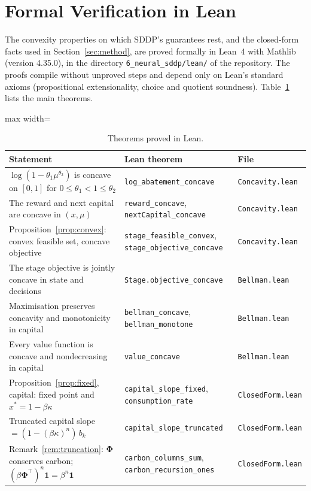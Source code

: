 \section{Formal Verification in Lean}
\label{app:lean}

The convexity properties on which SDDP's guarantees rest, and the closed-form facts used in Section~\ref{sec:method}, are proved formally in Lean~4 with Mathlib (version 4.35.0), in the directory \texttt{6\_neural\_sddp/lean/} of the repository. The proofs compile without unproved steps and depend only on Lean's standard axioms (propositional extensionality, choice and quotient soundness). Table~\ref{tab:lean} lists the main theorems.

\begin{table}[h]
\centering
\caption{Theorems proved in Lean.}
\label{tab:lean}
\begin{adjustbox}{max width=\textwidth}
\begin{tabular}{lll}
\toprule
Statement & Lean theorem & File \\
\midrule
$\log(1-\theta_1\mu^{\theta_2})$ is concave on $[0,1]$ for $0 \le \theta_1 < 1 \le \theta_2$ & \texttt{log\_abatement\_concave} & \texttt{Concavity.lean} \\
The reward and next capital are concave in $(x, \mu)$ & \texttt{reward\_concave}, \texttt{nextCapital\_concave} & \texttt{Concavity.lean} \\
Proposition~\ref{prop:convex}: convex feasible set, concave objective & \texttt{stage\_feasible\_convex}, \texttt{stage\_objective\_concave} & \texttt{Concavity.lean} \\
The stage objective is jointly concave in state and decisions & \texttt{Stage.objective\_concave} & \texttt{Bellman.lean} \\
Maximisation preserves concavity and monotonicity in capital & \texttt{bellman\_concave}, \texttt{bellman\_monotone} & \texttt{Bellman.lean} \\
Every value function is concave and nondecreasing in capital & \texttt{value\_concave} & \texttt{Bellman.lean} \\
Proposition~\ref{prop:fixed}, capital: fixed point and $x^* = 1 - \beta\kappa$ & \texttt{capital\_slope\_fixed}, \texttt{consumption\_rate} & \texttt{ClosedForm.lean} \\
Truncated capital slope $= (1 - (\beta\kappa)^n)\, b_k$ & \texttt{capital\_slope\_truncated} & \texttt{ClosedForm.lean} \\
Remark~\ref{rem:truncation}: $\bm{\Phi}$ conserves carbon; $(\beta\bm{\Phi}^\top)^n \bm{1} = \beta^n \bm{1}$ & \texttt{carbon\_columns\_sum}, \texttt{carbon\_recursion\_ones} & \texttt{ClosedForm.lean} \\
\bottomrule
\end{tabular}
\end{adjustbox}
\end{table}

